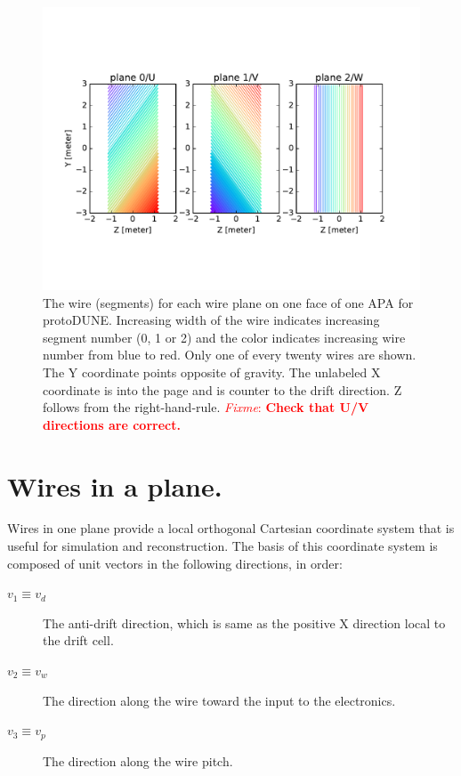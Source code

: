 \documentclass[pdftex,12pt,letter]{article}
\newcommand{\fixme}[1]{\textcolor{red}{\textit{Fixme}: \textbf{#1}}}
\begin{document}
\begin{figure}[htp]
  \centering
  \includegraphics[width=\textwidth]{wires-20.pdf}
  \caption{The wire (segments) for each wire plane on one face of one APA for protoDUNE.  Increasing width of the wire indicates increasing segment number (0, 1 or 2) and the color indicates increasing wire number from blue to red.  Only one of every twenty wires are shown. The Y coordinate points opposite of gravity.  The unlabeled X coordinate is into the page and is counter to the drift direction.  Z follows from the right-hand-rule.  \fixme{Check that U/V directions are correct.}}
  \label{fig:wires}
\end{figure}

\section{Wires in a plane.}

Wires in one plane provide a local orthogonal Cartesian coordinate
system that is useful for simulation and reconstruction.  The basis of
this coordinate system is composed of unit vectors in the following
directions, in order:

\begin{description}
\item[$v_1 \equiv v_d$] The anti-drift direction, which is same as the positive X direction local to the drift cell.
\item[$v_2 \equiv v_w$] The direction along the wire toward the input to the electronics.
\item[$v_3 \equiv v_p$] The direction along the wire pitch.
\end{description}
\end{document}
